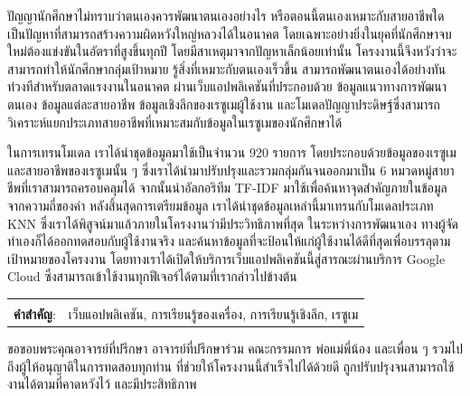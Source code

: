 \documentclass[12pt,oneside,openright,a4paper]{cpe-thai-project}
\begin{document}
\thaiabstract

ปัญญานักศึกษาไม่ทราบว่าตนเองควรพัฒนาตนเองอย่างไร หรือตอนนี้ตนเองเหมาะกับสายอาชีพใด เป็นปัญหาที่สามารถสร้างความผิดหวังใหญ่หลวงได้ในอนาคต
โดยเฉพาะอย่างยิ่งในยุคที่นักศึกษาจบใหม่ต้องแข่งขันในอัตราที่สูงขึ้นทุกปี โดยมีสาเหตุมาจากปัญหาเล็กน้อยเท่านั้น โครงงานนี้จึงหวังว่าจะสามารถทำให้นักศึกษากลุ่มเป้าหมาย
รู้สิ่งที่เหมาะกับตนเองเร็วขึ้น สามารถพัฒนาตนเองได้อย่างทันท่วงทีสำหรับตลาดแรงงานในอนาคต ผ่านเว็บแอปพลิเคชันที่ประกอบด้วย ข้อมูลแนวทางการพัฒนาตนเอง ข้อมูลแต่ละสายอาชีพ ข้อมูลเชิงลึกของเรซูเมผู้ใช้งาน
และโมเดลปัญญาประดิษฐ์ซึ่งสามารถวิเคราะห์แยกประเภทสายอาชีพที่เหมาะสมกับข้อมูลในเรซูเมของนักศึกษาได้

ในการเทรนโมเดล เราได้นำชุดข้อมูลมาใช้เป็นจำนวน 920 รายการ โดยประกอบด้วยข้อมูลของเรซูเมและสายอาชีพของเรซูเมนั้น ๆ
ซึ่งเราได้นำมาปรับปรุงและรวมกลุ่มกันจนออกมาเป็น 6 หมวดหมู่สายาชีพที่เราสามารถครอบคลุมได้ จากนั้นนำอัลกอริทึม TF-IDF มาใช้เพื่อค้นหาจุดสำคัญภายในข้อมูลจากความถี่ของคำ
หลังสิ้นสุดการเตรียมข้อมูล เราได้นำชุดข้อมูลเหล่านี้มาเทรนกับโมเดลประเภท KNN ซึ่งเราได้พิสูจน์มาแล้วภายในโครงงานว่ามีประวิทธิภาพที่สุด
ในระหว่างการพัฒนาเอง ทางผู้จัดทำเองก็ได้ออกทดสอบกับผู้ใช้งานจริง และค้นหาข้อมูลที่จะป้อนให้แก่ผู้ใช้งานได้ดีที่สุดเพื่อบรรลุตามเป้าหมายของโครงงาน
โดยทางเราได้เปิดให้บริการเว็บแอปพลิเคชันนี้สู่สารณะผ่านบริการ Google Cloud ซึ่งสามารถเข้าใช้งานทุกฟีเจอร์ได้ตามที่เรากล่าวไปข้างต้น

\begin{flushleft}
    \begin{tabular*}{\textwidth}{@{}lp{}}
        & \\

        \textbf{คำสำคัญ}: & เว็บแอปพลิเคชัน, การเรียนรู้ของเครื่อง, การเรียนรู้เชิงลึก, เรซูเม
    \end{tabular*}
\end{flushleft}
\endabstract


\preface
ขอขอบพระคุณอาจารย์ที่ปรึกษา อาจารย์ที่ปรึกษาร่วม คณะกรรมการ พ่อแม่พี่น้อง และเพื่อน ๆ รวมไปถึงผู้ให้อนุญาติในการทดสอบทุกท่าน
ที่ช่วยให้โครงงานนี้สำเร็จไปได้ด้วยดี ถูกปรับปรุงจนสามารถใช้งานได้ตามที่คาดหวังไว้ และมีประสิทธิภาพ
\end{document}
